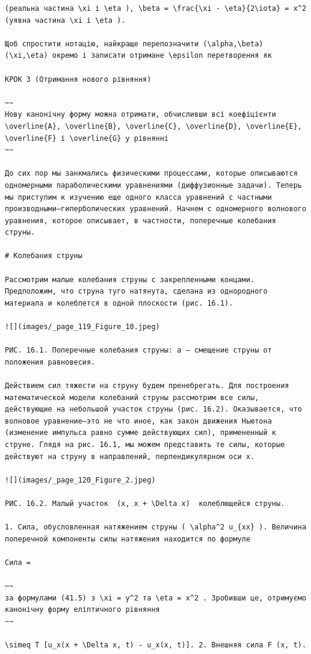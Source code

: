 \documentclass[
  ukrainian,
]{article}
\begin{document}
\begin{verbatim}
(реальна частина \xi і \eta ), \beta = \frac{\xi - \eta}{2\iota} = x^2 (уявна частина \xi і \eta ).

Щоб спростити нотацію, найкраще перепозначити (\alpha,\beta) (\xi,\eta) окремо і записати отримане \epsilon перетворення як

КРОК 3 (Отримання нового рівняння)

~~
Нову канонічну форму можна отримати, обчисливши всі коефіцієнти \overline{A}, \overline{B}, \overline{C}, \overline{D}, \overline{E}, \overline{F} і \overline{G} у рівнянні
~~

До сих пор мы занкмались физическими процессами, которые описываются одномерными параболическими уравнениями (диффузионные задачи). Теперь мы приступим к изучению еще одного класса уравнений с частными производными—гиперболических уравнений. Начнем с одномерного волнового уравнения, которое описывает, в частности, поперечные колебания струны.

# Колебания струны

Рассмотрим малые колебания струны с закрепленными концами. Предположим, что струна туго натянута, сделана из однородного материала и колеблется в одной плоскости (рис. 16.1).

![](images/_page_119_Figure_10.jpeg)

РИС. 16.1. Поперечные колебания струны: a — смещение струны от положения равновесия.

Действием сил тяжести на струну будем пренебрегать. Для построения математической модели колебаний струны рассмотрим все силы, действующие на небольшой участок струны (рис. 16.2). Оказывается, что волновое уравнение—это не что иное, как закон движения Ньютона (изменение импульса равно сумме действующих сил), примененный к струне. Глядя на рис. 16.1, мы можем представить те силы, которые действуют на струну в направлений, перпендикулярном оси х.

![](images/_page_120_Figure_2.jpeg)

РИС. 16.2. Малый участок  (x, x + \Delta x)  колеблющейся струны.

1. Сила, обусловленная натяжением струны ( \alpha^2 u_{xx} ). Величина поперечной компоненты силы натяжения находится по формуле

Сила =

~~
за формулами (41.5) з \xi = y^2 та \eta = x^2 . Зробивши це, отримуємо канонічну форму еліптичного рівняння
~~

\simeq T [u_x(x + \Delta x, t) - u_x(x, t)]. 2. Внешняя сила F (x, t).


\end{verbatim}
\end{document}
